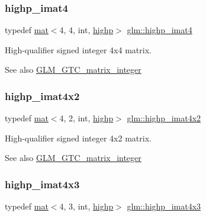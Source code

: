 \subsubsection{\texorpdfstring{highp\+\_\+imat4}{highp\_imat4}}
{\footnotesize\ttfamily typedef \hyperlink{structglm_1_1mat}{mat}$<$4, 4, int, \hyperlink{namespaceglm_a36ed105b07c7746804d7fdc7cc90ff25ac6f7eab42eacbb10d59a58e95e362074}{highp}$>$ \hyperlink{group__gtc__matrix__integer_ga2f3fec7874f434d081a186d11ccbed3c}{glm\+::highp\+\_\+imat4}}

High-\/qualifier signed integer 4x4 matrix. \begin{DoxySeeAlso}{See also}
\hyperlink{group__gtc__matrix__integer}{G\+L\+M\+\_\+\+G\+T\+C\+\_\+matrix\+\_\+integer} 
\end{DoxySeeAlso}
\mbox{\label{group__gtc__matrix__integer_gac3bc64ec9129474635c6973f79c149a7}} 
\subsubsection{\texorpdfstring{highp\+\_\+imat4x2}{highp\_imat4x2}}
{\footnotesize\ttfamily typedef \hyperlink{structglm_1_1mat}{mat}$<$4, 2, int, \hyperlink{namespaceglm_a36ed105b07c7746804d7fdc7cc90ff25ac6f7eab42eacbb10d59a58e95e362074}{highp}$>$ \hyperlink{group__gtc__matrix__integer_gac3bc64ec9129474635c6973f79c149a7}{glm\+::highp\+\_\+imat4x2}}

High-\/qualifier signed integer 4x2 matrix. \begin{DoxySeeAlso}{See also}
\hyperlink{group__gtc__matrix__integer}{G\+L\+M\+\_\+\+G\+T\+C\+\_\+matrix\+\_\+integer} 
\end{DoxySeeAlso}
\mbox{\label{group__gtc__matrix__integer_ga03ddba7301f182bf5cb1e66a6aa43bcb}} 
\subsubsection{\texorpdfstring{highp\+\_\+imat4x3}{highp\_imat4x3}}
{\footnotesize\ttfamily typedef \hyperlink{structglm_1_1mat}{mat}$<$4, 3, int, \hyperlink{namespaceglm_a36ed105b07c7746804d7fdc7cc90ff25ac6f7eab42eacbb10d59a58e95e362074}{highp}$>$ \hyperlink{group__gtc__matrix__integer_ga03ddba7301f182bf5cb1e66a6aa43bcb}{glm\+::highp\+\_\+imat4x3}}


